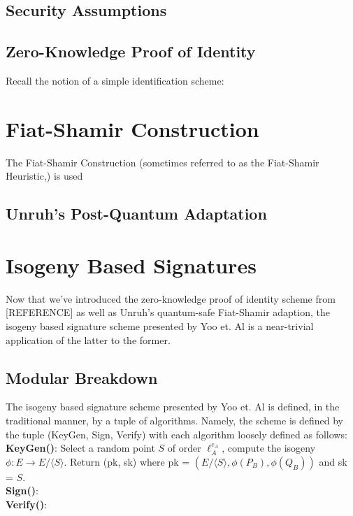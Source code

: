\subsection{Security Assumptions}



\subsection{Zero-Knowledge Proof of Identity}

Recall the notion of a simple identification scheme:

\section{Fiat-Shamir Construction}

The Fiat-Shamir Construction (sometimes referred to as the Fiat-Shamir Heuristic,) is used

\subsection{Unruh's Post-Quantum Adaptation}



\section{Isogeny Based Signatures}

Now that we've introduced the zero-knowledge proof of identity scheme from [REFERENCE] as well as Unruh's quantum-safe Fiat-Shamir adaption, the isogeny based signature scheme presented by Yoo et. Al is a near-trivial application of the latter to the former. 

\subsection{Modular Breakdown}

The isogeny based signature scheme presented by Yoo et. Al is defined, in the traditional manner, by a tuple of algorithms. Namely, the scheme is defined by the tuple (KeyGen, Sign, Verify) with each algorithm loosely defined as follows:\\
\textbf{KeyGen(}\textbf{)}: Select a random point $S$ of order $\ell_{A}^{e_A}$, compute the isogeny $\phi: E \rightarrow E/ \langle S \rangle$. Return (pk, sk) where pk = $(E/ \langle S \rangle, \phi(P_B), \phi(Q_B))$ and sk = $S$.\\
\textbf{Sign()}:\\
\textbf{Verify()}:\\

